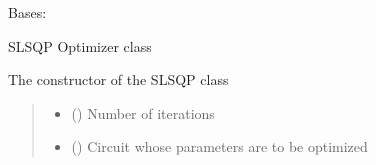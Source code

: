\documentclass[letterpaper,10pt,english]{sphinxmanual}
\begin{document}
\begin{fulllineitems}
\begin{fulllineitems}
\begin{quote}
\begin{description}
\begin{itemize}
\end{itemize}

\end{description}\end{quote}

\end{fulllineitems}


\end{fulllineitems}


\begin{fulllineitems}
\label{\detokenize{qcompute_qapp.optimizer:qcompute_qapp.optimizer.SLSQP}}
\pysigstartsignatures
{}
\pysigstopsignatures
\sphinxAtStartPar
Bases: {\hyperref[\detokenize{qcompute_qapp.optimizer:qcompute_qapp.optimizer.BasicOptimizer}]{}}

\sphinxAtStartPar
SLSQP Optimizer class

\sphinxAtStartPar
The constructor of the SLSQP class
\begin{quote}\begin{description}
\begin{itemize}
\item {} 
\sphinxAtStartPar
{} () \textendash{} Number of iterations

\item {} 
\sphinxAtStartPar
{} ({\hyperref[\detokenize{qcompute_qapp.circuit:qcompute_qapp.circuit.BasicCircuit}]{}}) \textendash{} Circuit whose parameters are to be optimized

\end{itemize}

\end{description}\end{quote}


\end{fulllineitems}
\end{document}
